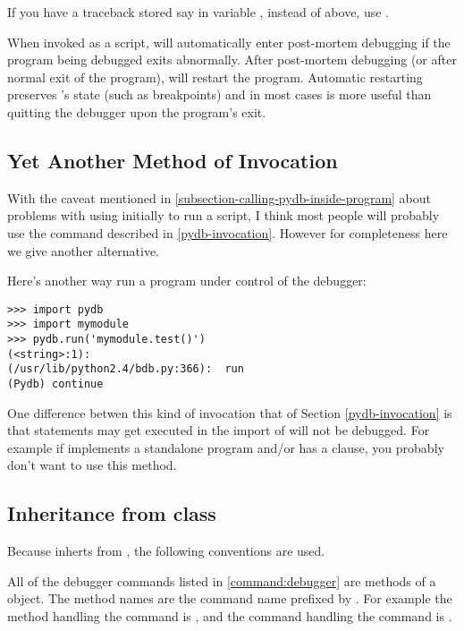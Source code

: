 If you have a traceback stored say in variable , instead of 
 above, use .

When invoked as a script,  will automatically enter
post-mortem debugging if the program being debugged exits
abnormally. After post-mortem debugging (or after normal exit of the
program),  will restart the program.  Automatic restarting
preserves 's state (such as breakpoints) and in most cases is more
useful than quitting the debugger upon the program's exit.

\subsection{Yet Another Method of Invocation}

With the caveat mentioned in
\ref{subsection-calling-pydb-inside-program} about problems with using
 initially to run a script, I think most people will
probably use the  command described in
\ref{pydb-invocation}. However for completeness here we give another
alternative.

Here's another way run a program under control of the debugger:

\begin{verbatim}
>>> import pydb
>>> import mymodule
>>> pydb.run('mymodule.test()')
(<string>:1): 
(/usr/lib/python2.4/bdb.py:366):  run
(Pydb) continue
\end{verbatim}

One difference betwen this kind of invocation that of Section
\ref{pydb-invocation} is that statements may get executed in the
import of  will not be debugged. For example if
 implements a standalone program and/or has a
 clause, you probably don't want to use
this method.


\subsection{Inheritance from class }
Because  inherts from , the following
conventions are used. 

All of the debugger commands listed in \ref{command:debugger} are methods
of a  object. The method names are the command name prefixed by
. For example the method handling the  command is
, and the command handling the  command is
. 

